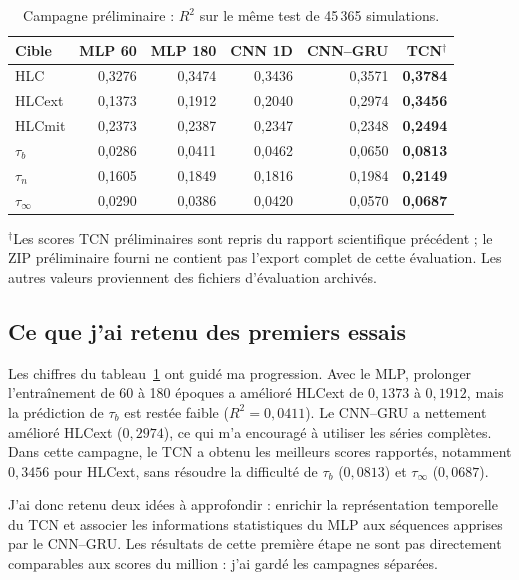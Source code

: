 \documentclass[10pt,a4paper]{article}
\begin{document}
\begin{table}[htbp]
\centering
\caption{Campagne préliminaire : $R^2$ sur le même test de 45\,365 simulations.}
\label{tab:500k}
\footnotesize
\setlength{\tabcolsep}{4.4pt}
\begin{tabular}{lrrrrr}
\toprule
Cible & MLP 60 & MLP 180 & CNN 1D & CNN--GRU & TCN$^\dagger$ \\
\midrule
HLC & 0,3276 & 0,3474 & 0,3436 & 0,3571 & \textbf{0,3784} \\
HLCext & 0,1373 & 0,1912 & 0,2040 & 0,2974 & \textbf{0,3456} \\
HLCmit & 0,2373 & 0,2387 & 0,2347 & 0,2348 & \textbf{0,2494} \\
$\tau_b$ & 0,0286 & 0,0411 & 0,0462 & 0,0650 & \textbf{0,0813} \\
$\tau_n$ & 0,1605 & 0,1849 & 0,1816 & 0,1984 & \textbf{0,2149} \\
$\tau_\infty$ & 0,0290 & 0,0386 & 0,0420 & 0,0570 & \textbf{0,0687} \\
\bottomrule
\end{tabular}
\vspace{0.2em}
\begin{minipage}{0.99\linewidth}\footnotesize $^\dagger$Les scores TCN préliminaires sont repris du rapport scientifique précédent ; le ZIP préliminaire fourni ne contient pas l'export complet de cette évaluation. Les autres valeurs proviennent des fichiers d'évaluation archivés.\end{minipage}
\end{table}

\subsection{Ce que j'ai retenu des premiers essais}
Les chiffres du tableau~\ref{tab:500k} ont guidé ma progression. Avec le MLP, prolonger l'entraînement de 60 à 180 époques a amélioré HLCext de $0{,}1373$ à $0{,}1912$, mais la prédiction de $\tau_b$ est restée faible ($R^2=0{,}0411$). Le CNN--GRU a nettement amélioré HLCext ($0{,}2974$), ce qui m'a encouragé à utiliser les séries complètes. Dans cette campagne, le TCN a obtenu les meilleurs scores rapportés, notamment $0{,}3456$ pour HLCext, sans résoudre la difficulté de $\tau_b$ ($0{,}0813$) et $\tau_\infty$ ($0{,}0687$).

J'ai donc retenu deux idées à approfondir : enrichir la représentation temporelle du TCN et associer les informations statistiques du MLP aux séquences apprises par le CNN--GRU. Les résultats de cette première étape ne sont pas directement comparables aux scores du million : j'ai gardé les campagnes séparées.
\end{document}
